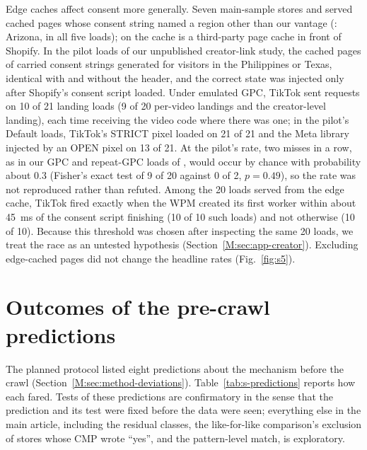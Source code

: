 \documentclass[preprint,11pt,authoryear,a4paper]{elsarticle}
\begin{document}
Edge caches affect consent more generally. Seven main-sample stores and \storeC served cached pages whose consent string named a region other than our vantage (\storeC: Arizona, in all five loads); on \storeC the cache is a third-party page cache in front of Shopify. In the pilot loads of our unpublished creator-link study, the cached pages of \storeC carried consent strings generated for visitors in the Philippines or Texas, identical with and without the  header, and the correct state was injected only after Shopify's consent script loaded. Under emulated GPC, TikTok sent requests on 10 of 21 landing loads (9 of 20 per-video landings and the creator-level landing), each time receiving the video code where there was one; in the pilot's Default loads, TikTok's STRICT pixel loaded on 21 of 21 and the Meta library injected by an OPEN pixel on 13 of 21. At the pilot's rate, two misses in a row, as in our GPC and repeat-GPC loads of \storeC, would occur by chance with probability about 0.3 (Fisher's exact test of 9 of 20 against 0 of 2, $p=0.49$), so the rate was not reproduced rather than refuted. Among the 20 loads served from the edge cache, TikTok fired exactly when the WPM created its first worker within about 45~ms of the consent script finishing (10 of 10 such loads) and not otherwise (10 of 10). Because this threshold was chosen after inspecting the same 20 loads, we treat the race as an untested hypothesis (Section~\ref*{M:sec:app-creator}). Excluding edge-cached pages did not change the headline rates (Fig.~\ref{fig:s5}).

\section{Outcomes of the pre-crawl predictions}\label{sec:s-predictions}

The planned protocol listed eight predictions about the mechanism before the crawl (Section~\ref*{M:sec:method-deviations}). Table~\ref{tab:s-predictions} reports how each fared. Tests of these predictions are confirmatory in the sense that the prediction and its test were fixed before the data were seen; everything else in the main article, including the residual classes, the like-for-like comparison's exclusion of stores whose CMP wrote ``yes'', and the pattern-level match, is exploratory.
\end{document}
